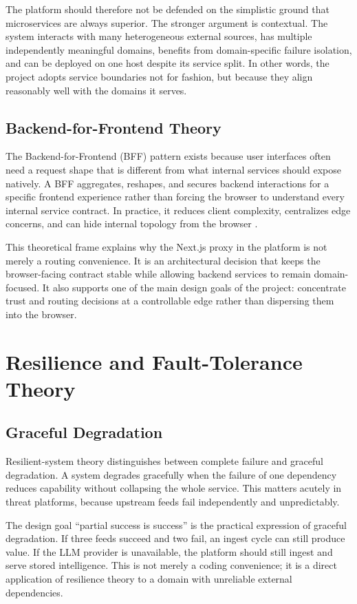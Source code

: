 The platform should therefore not be defended on the simplistic ground that microservices are always superior. The stronger argument is contextual. The system interacts with many heterogeneous external sources, has multiple independently meaningful domains, benefits from domain-specific failure isolation, and can be deployed on one host despite its service split. In other words, the project adopts service boundaries not for fashion, but because they align reasonably well with the domains it serves.

\subsection{Backend-for-Frontend Theory}
The Backend-for-Frontend (BFF) pattern exists because user interfaces often need a request shape that is different from what internal services should expose natively. A BFF aggregates, reshapes, and secures backend interactions for a specific frontend experience rather than forcing the browser to understand every internal service contract. In practice, it reduces client complexity, centralizes edge concerns, and can hide internal topology from the browser \cite{backend_for_frontend_pattern}.

This theoretical frame explains why the Next.js proxy in the platform is not merely a routing convenience. It is an architectural decision that keeps the browser-facing contract stable while allowing backend services to remain domain-focused. It also supports one of the main design goals of the project: concentrate trust and routing decisions at a controllable edge rather than dispersing them into the browser.

\section{Resilience and Fault-Tolerance Theory}
\subsection{Graceful Degradation}
Resilient-system theory distinguishes between complete failure and graceful degradation. A system degrades gracefully when the failure of one dependency reduces capability without collapsing the whole service. This matters acutely in threat platforms, because upstream feeds fail independently and unpredictably.

The design goal ``partial success is success'' is the practical expression of graceful degradation. If three feeds succeed and two fail, an ingest cycle can still produce value. If the LLM provider is unavailable, the platform should still ingest and serve stored intelligence. This is not merely a coding convenience; it is a direct application of resilience theory to a domain with unreliable external dependencies.

